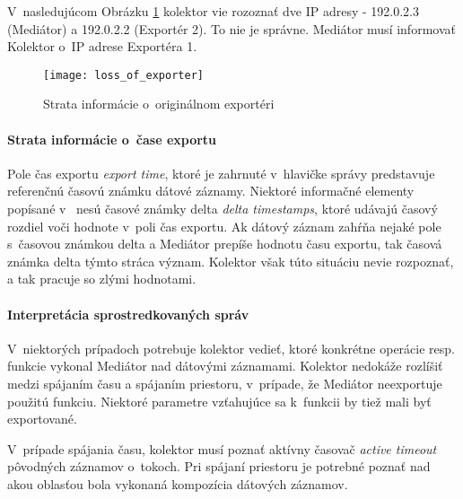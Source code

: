 V~nasledujúcom Obrázku \ref{o:loss_of_exporter} kolektor vie rozoznať dve IP adresy - 192.0.2.3 (Mediátor) 
a 192.0.2.2 (Exportér 2). To nie je správne. Mediátor musí informovať Kolektor o~IP adrese Exportéra 1.

\begin{figure}[ht!]
\centering
\texttt{[image: loss\_of\_exporter]}
\caption{Strata informácie o~originálnom exportéri}\label{o:loss_of_exporter}
\end{figure}


\paragraph{Strata informácie o~čase exportu} \label{sec:loss_time}

Pole čas exportu \emph{export time}, ktoré je zahrnuté v~hlavičke správy predstavuje referenčnú 
časovú známku dátové záznamy. Niektoré informačné elementy popísané v~\citep{rfc5102} nesú 
časové známky delta \emph{delta timestamps}, ktoré udávajú časový rozdiel voči hodnote v~poli 
čas exportu. Ak dátový záznam zahŕňa nejaké pole s~časovou známkou delta a Mediátor prepíše hodnotu 
času exportu,  tak časová známka delta týmto stráca význam. Kolektor však túto situáciu nevie 
rozpoznať, a tak pracuje so zlými hodnotami.


\paragraph{Interpretácia sprostredkovaných správ}

V~niektorých prípadoch potrebuje kolektor vedieť, ktoré konkrétne operácie resp. funkcie vykonal Mediátor 
nad dátovými záznamami. Kolektor nedokáže rozlíšiť medzi spájaním času a spájaním priestoru, v~prípade, že 
Mediátor neexportuje použitú funkciu. Niektoré parametre vzťahujúce sa k~funkcii by tiež mali byť 
exportované. 

V~prípade spájania času, kolektor musí poznať aktívny časovač \emph{active timeout} 
pôvodných záznamov o~tokoch. Pri spájaní priestoru je potrebné poznať nad akou oblasťou bola 
vykonaná kompozícia dátových záznamov.\citep{rfc5982}


